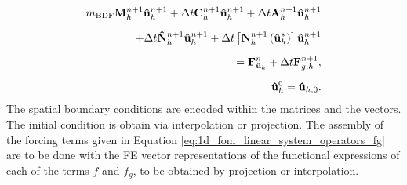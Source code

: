 \documentclass[../../thesis.tex]{subfiles}
\newcommand{\dt}{\ensuremath{\Delta t}}
\begin{document}
\begin{subequations}
    \begin{align}
        \label{eq:1d_fom_weak_formulation_discrete}
        m_{\text{BDF}} \vb{M}^{n+1}_h \vb{\hat{u}}_{h}^{n+1} 
        + \dt \vb{C}^{n+1}_h \vb{\hat{u}}_{h}^{n+1} 
        + \dt \vb{A}^{n+1}_h \vb{\hat{u}}_{h}^{n+1} 
        \nonumber 
        \\[2mm] 
        + \dt \vb{\hat{N}}^{n+1}_h \vb{\hat{u}}_{h}^{n+1} 
        + \dt \left[\vb{N}^{n+1}_h\left(\vb{\hat{u}}_{h}^{*}\right)\right] \vb{\hat{u}}_{h}^{n+1} 
        \nonumber
        \\[2mm] 
        = \vb{F}_{\vb{\hat{u}}_h}^{n}
        + \dt \vb{F}_{g,h}^{n+1}, 
        \\[2mm]
        \vb{\hat{u}}_h^{0} = \vb{\hat{u}}_{h,0}.
    \end{align}
\end{subequations}
The spatial boundary conditions are encoded within the matrices and the vectors. 
The initial condition is obtain via interpolation or projection.
The assembly of the forcing terms given in Equation \eqref{eq:1d_fom_linear_system_operators_fg}
are to be done with the FE vector representations of the functional expressions of each of the terms $f$ and $f_g$, to be obtained by projection or interpolation.
\end{document}
